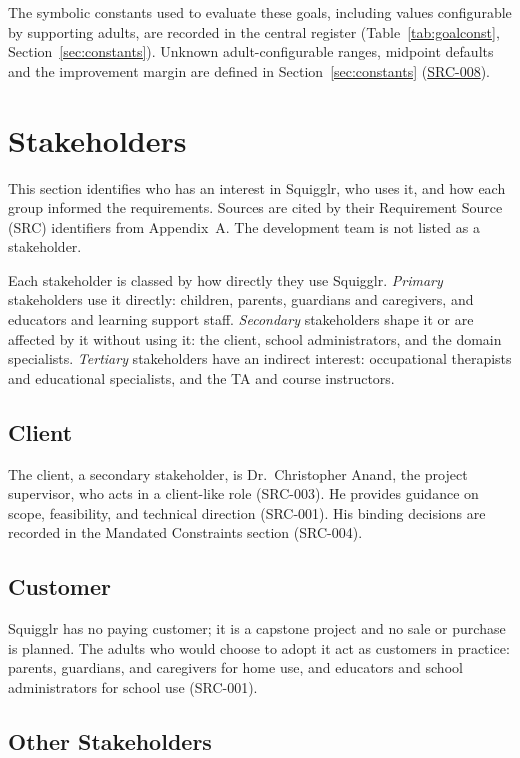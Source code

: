 \documentclass[12pt]{article}
\renewcommand{\_}{\textunderscore\allowbreak}%
\newcommand{\srcref}[1]{\hyperref[src:#1]{SRC-#1}}
\begin{document}
The symbolic constants used to evaluate these goals, including values
configurable by supporting adults, are recorded in the central register
(Table~\ref{tab:goalconst}, Section~\ref{sec:constants}). Unknown
adult-configurable ranges, midpoint defaults and the improvement margin are
defined in Section~\ref{sec:constants} (\srcref{008}).

\section{Stakeholders}
\label{sec:stakeholders}

This section identifies who has an interest in Squigglr, who uses it, and how
each group informed the requirements. Sources are cited by their Requirement
Source (SRC) identifiers from Appendix~A. The development team is not listed as
a stakeholder.

Each stakeholder is classed by how directly they use Squigglr. \emph{Primary}
stakeholders use it directly: children, parents, guardians and caregivers, and
educators and learning support staff. \emph{Secondary} stakeholders shape it or
are affected by it without using it: the client, school administrators, and the
domain specialists. \emph{Tertiary} stakeholders have an indirect interest:
occupational therapists and educational specialists, and the TA and course
instructors.

\subsection{Client}

The client, a secondary stakeholder, is Dr.~Christopher Anand, the project
supervisor, who acts in a client-like role (SRC-003). He provides guidance on
scope, feasibility, and technical direction (SRC-001). His binding decisions are
recorded in the Mandated Constraints section (SRC-004).

\subsection{Customer}

Squigglr has no paying customer; it is a capstone project and no sale or
purchase is planned. The adults who would choose to adopt it act as customers in
practice: parents, guardians, and caregivers for home use, and educators and
school administrators for school use (SRC-001).

\subsection{Other Stakeholders}
\end{document}
